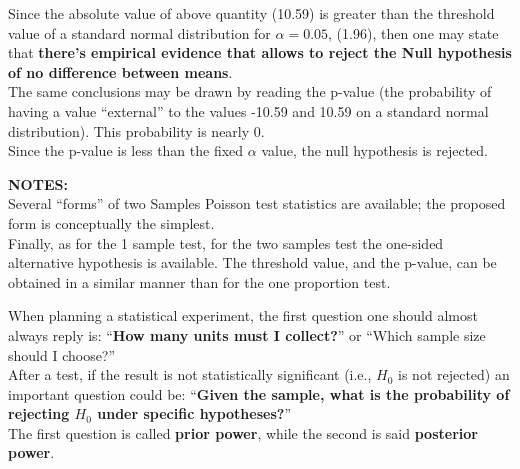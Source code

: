 \begin{frame}
  \vspace{0.5cm}
  Since the absolute value of above quantity (10.59) is greater than the threshold value of a standard normal distribution for $\alpha = 0.05$, (1.96), then one may state that \textbf{there's empirical evidence that allows to reject the Null hypothesis of no difference between means}.\\
  \vspace{0.75cm}
  The same conclusions may be drawn by reading the p-value (the probability of having a value ``external'' to the values -10.59 and 10.59 on a standard normal distribution). This probability is nearly 0.\\
  Since the p-value is less than the fixed $ \alpha $ value, the null hypothesis is rejected.
\end{frame}

\begin{frame}
  \vspace{0.25cm}
  \textbf{NOTES:}\\
  \vspace{0.5cm}
  Several ``forms'' of two Samples Poisson test statistics are available; the proposed form is conceptually the simplest.\\
  \vspace{0.75cm}
  Finally, as for the 1 sample test, for the two samples test the one-sided alternative hypothesis is available. The threshold value, and the p-value, can be obtained in a similar manner than for the one proportion test.
\end{frame}




\begin{frame}
  \vspace*{.5cm}
  When planning a statistical experiment, the first question one should almost always reply is: ``\textbf{How many units must I collect?}'' or ``Which sample size should I choose?''\\
  \vspace*{.75cm}
  After a test, if the result is not statistically significant (i.e., $H_0$ is not rejected) an important question could be: ``\textbf{Given the sample, what is the probability of rejecting $H_0$ under specific hypotheses?}'' \\
  \vspace*{.75cm}
  The first question is called \textbf{prior power}, while the second is said \textbf{posterior power}.
\end{frame}

